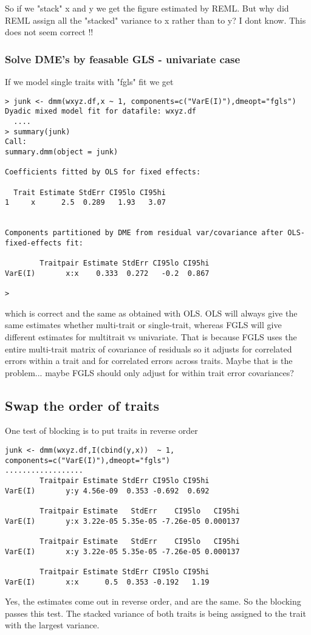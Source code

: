 \documentclass{report}  %
\begin{document}
So if we "stack" x and y we get the figure estimated by REML.
But why did REML assign all the "stacked" variance to x rather than to y?
I dont know.
This does not seem correct !!
 
\subsubsection{Solve DME's by feasable GLS - univariate case}
If we model single traits with  "fgls" fit we get
\begin{verbatim}
> junk <- dmm(wxyz.df,x ~ 1, components=c("VarE(I)"),dmeopt="fgls")
Dyadic mixed model fit for datafile: wxyz.df  
  ....
> summary(junk)
Call:
summary.dmm(object = junk)

Coefficients fitted by OLS for fixed effects:

  Trait Estimate StdErr CI95lo CI95hi
1     x      2.5  0.289   1.93   3.07


Components partitioned by DME from residual var/covariance after OLS-fixed-effects fit:

        Traitpair Estimate StdErr CI95lo CI95hi
VarE(I)       x:x    0.333  0.272   -0.2  0.867

> 
\end{verbatim}
which is correct and the same as obtained with OLS. 
OLS will always give the same estimates whether multi-trait or single-trait,  whereas FGLS will give different estimates for multitrait vs univariate. That is because FGLS uses the entire multi-trait matrix of covariance of residuals so it adjusts for correlated errors within a trait and for correlated errors across traits. Maybe that is the problem... maybe FGLS should only adjust for within trait error covariances?  

\subsection{Swap the order of traits}
One test of blocking is to put traits in reverse order
\begin{verbatim}
junk <- dmm(wxyz.df,I(cbind(y,x))  ~ 1, components=c("VarE(I)"),dmeopt="fgls")
..................
        Traitpair Estimate StdErr CI95lo CI95hi
VarE(I)       y:y 4.56e-09  0.353 -0.692  0.692

        Traitpair Estimate   StdErr    CI95lo   CI95hi
VarE(I)       y:x 3.22e-05 5.35e-05 -7.26e-05 0.000137

        Traitpair Estimate   StdErr    CI95lo   CI95hi
VarE(I)       x:y 3.22e-05 5.35e-05 -7.26e-05 0.000137

        Traitpair Estimate StdErr CI95lo CI95hi
VarE(I)       x:x      0.5  0.353 -0.192   1.19
\end{verbatim}
 Yes, the estimates come out in reverse order, and are the same.
So the blocking passes this test. The stacked variance of both traits is being assigned to the trait with the largest variance.
\end{document}
